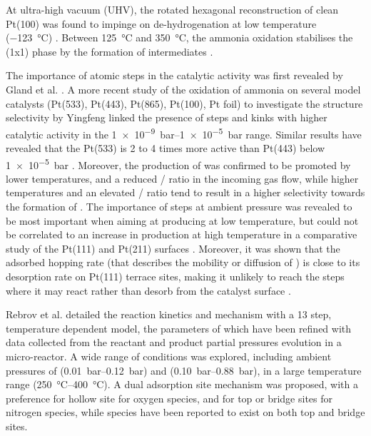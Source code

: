 At ultra-high vacuum (UHV), the rotated hexagonal reconstruction of clean Pt(100) was found to impinge on  de-hydrogenation at low temperature (\qty{-123}{\degreeCelsius}) \parencite{Bradley1997}.
Between \qty{125}{\degreeCelsius} and \qty{350}{\degreeCelsius}, the ammonia oxidation stabilises the (1x1) phase by the formation of  intermediates \parencite{Rafti2007}.

The importance of atomic steps in the catalytic activity was first revealed by Gland et al. \parencite*{Gland1978, Gland1980}.
A more recent study of the oxidation of ammonia on several model catalysts (Pt(533), Pt(443), Pt(865), Pt(100), Pt foil) to investigate the structure selectivity by Yingfeng \parencite*{Yingfeng2008} linked the presence of steps and kinks with higher catalytic activity in the \qtyrange{1e-9}{1e-5}{\bar} range.
Similar results have revealed that the Pt(533) is 2 to 4 times more active than Pt(443) below \qty{1e-5}{\bar} \parencite{Scheibe2005}.
Moreover, the production of  was confirmed to be promoted by lower temperatures, and a reduced / ratio in the incoming gas flow, while higher temperatures and an elevated / ratio tend to result in a higher selectivity towards the formation of  \parencite{Zeng2009}.
The importance of steps at ambient pressure was revealed to be most important when aiming at producing  at low temperature, but could not be correlated to an increase in  production at high temperature in a comparative study of the Pt(111) and Pt(211) surfaces \parencite{Ma2019}.
Moreover, it was shown that the adsorbed  hopping rate (that describes the mobility or diffusion of ) is close to its desorption rate on Pt(111) terrace sites, making it unlikely to reach the steps where it may react rather than desorb from the catalyst surface \parencite{Borodin2021}.

Rebrov et al. \parencite*{Rebrov2002} detailed the reaction kinetics and mechanism with a 13 step, temperature dependent model, the parameters of which have been refined with data collected from the reactant and product partial pressures evolution in a micro-reactor.
A wide range of conditions was explored, including ambient pressures of  (\qtyrange{0.01}{0.12}{\bar}) and  (\qtyrange{0.10}{0.88}{\bar}), in a large temperature range (\qtyrange{250}{400}{\degreeCelsius}).
A dual adsorption site mechanism was proposed, with a preference for hollow site for oxygen species, and for top or bridge sites for nitrogen species, while  species have been reported to exist on both top and bridge sites.

